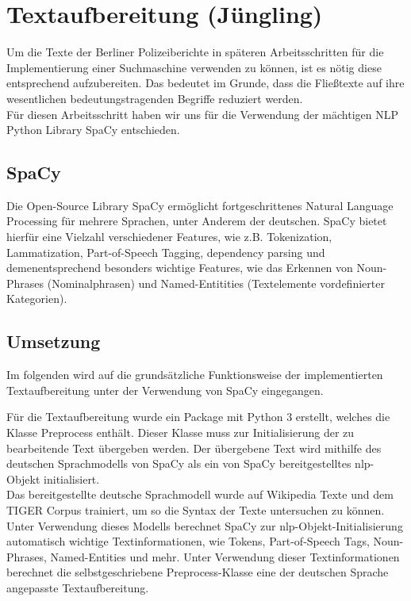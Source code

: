 \chapter{Textaufbereitung \small(Jüngling)}
\label{ch:Textaufbereitung}

Um die Texte der Berliner Polizeiberichte in späteren Arbeitsschritten für die Implementierung einer Suchmaschine verwenden zu können, ist es nötig diese entsprechend aufzubereiten. Das bedeutet im Grunde, dass die Fließtexte auf ihre wesentlichen bedeutungstragenden Begriffe reduziert werden. 
\\Für diesen Arbeitsschritt haben wir uns für die Verwendung der mächtigen NLP Python Library SpaCy entschieden. 

\section{SpaCy}
Die Open-Source Library SpaCy ermöglicht fortgeschrittenes Natural Language Processing für mehrere Sprachen, unter Anderem der deutschen. SpaCy bietet hierfür eine Vielzahl verschiedener Features, wie z.B. Tokenization, Lammatization, Part-of-Speech Tagging, dependency parsing und demenentsprechend besonders wichtige Features, wie das Erkennen von Noun-Phrases (Nominalphrasen) und Named-Entitities (Textelemente vordefinierter Kategorien). 

\section{Umsetzung}
Im folgenden wird auf die grundsätzliche Funktionsweise der implementierten Textaufbereitung unter der Verwendung von SpaCy eingegangen.

Für die Textaufbereitung wurde ein Package mit Python 3 erstellt, welches die Klasse Preprocess enthält. Dieser Klasse muss zur Initialisierung der zu bearbeitende Text übergeben werden. Der übergebene Text wird mithilfe des deutschen Sprachmodells von SpaCy als ein von SpaCy bereitgestelltes nlp-Objekt initialisiert. 
\\Das bereitgestellte deutsche Sprachmodell wurde auf Wikipedia Texte und dem TIGER Corpus trainiert, um so die Syntax der Texte untersuchen zu können. Unter Verwendung dieses Modells berechnet SpaCy zur nlp-Objekt-Initialisierung automatisch wichtige Textinformationen, wie Tokens, Part-of-Speech Tags, Noun-Phrases, Named-Entities und mehr. Unter Verwendung dieser Textinformationen berechnet die selbstgeschriebene Preprocess-Klasse eine der deutschen Sprache angepasste Textaufbereitung.

